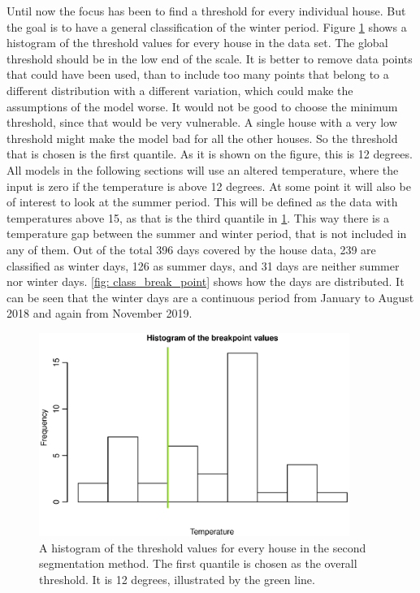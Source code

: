 \noindent Until now the focus has been to find a threshold for every individual house. But the goal is to have a general classification of the winter period. Figure \ref{fig: AlphaHist} shows a histogram of the threshold values for every house in the data set. The global threshold should be in the low end of the scale. It is better to remove data points that could have been used, than to include too many points that belong to a different distribution with a different variation, which could make the assumptions of the model worse. It would not be good to choose the minimum threshold, since that would be very vulnerable. A single house with a very low threshold might make the model bad for all the other houses. So the threshold that is chosen is the first quantile. As it is shown on the figure, this is 12 degrees. All models in the following sections will use an altered temperature, where the input is zero if the temperature is above 12 degrees. At some point it will also be of interest to look at the summer period. This will be defined as the data with temperatures above 15, as that is the third quantile in \cref{fig: AlphaHist}. This way there is a temperature gap between the summer and winter period, that is not included in any of them. Out of the total 396 days covered by the house data, 239 are classified as winter days, 126 as summer days, and 31 days are neither summer nor winter days. \cref{fig: class_break_point} shows how the days are distributed. It can be seen that the winter days are a continuous period from January to August 2018 and again from November 2019.
\begin{figure}[ht]
    \centering
    \includegraphics[width=0.9\textwidth]{../../../figures/AlphaHist.eps}
    \caption{A histogram of the threshold values for every house in the second segmentation method. The first quantile is chosen as the overall threshold. It is 12 degrees, illustrated by the green line.}
    \label{fig: AlphaHist}
\end{figure}
